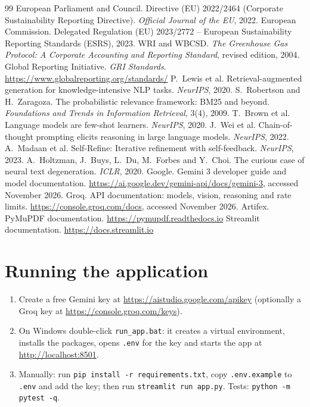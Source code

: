 \documentclass[11pt,a4paper]{article}
\newcommand{\code}[1]{\texttt{\small #1}}
\begin{document}
\begin{thebibliography}{99}\small
{} European Parliament and Council. Directive (EU) 2022/2464 (Corporate Sustainability Reporting Directive). \emph{Official Journal of the EU}, 2022.
 European Commission. Delegated Regulation (EU) 2023/2772 -- European Sustainability Reporting Standards (ESRS), 2023.
 WRI and WBCSD. \emph{The Greenhouse Gas Protocol: A Corporate Accounting and Reporting Standard}, revised edition, 2004.
 Global Reporting Initiative. \emph{GRI Standards}. \url{https://www.globalreporting.org/standards/}
 P.~Lewis et al. Retrieval-augmented generation for knowledge-intensive NLP tasks. \emph{NeurIPS}, 2020.
 S.~Robertson and H.~Zaragoza. The probabilistic relevance framework: BM25 and beyond. \emph{Foundations and Trends in Information Retrieval}, 3(4), 2009.
 T.~Brown et al. Language models are few-shot learners. \emph{NeurIPS}, 2020.
 J.~Wei et al. Chain-of-thought prompting elicits reasoning in large language models. \emph{NeurIPS}, 2022.
 A.~Madaan et al. Self-Refine: Iterative refinement with self-feedback. \emph{NeurIPS}, 2023.
 A.~Holtzman, J.~Buys, L.~Du, M.~Forbes and Y.~Choi. The curious case of neural text degeneration. \emph{ICLR}, 2020.
 Google. Gemini 3 developer guide and model documentation. \url{https://ai.google.dev/gemini-api/docs/gemini-3}, accessed November 2026.
 Groq. API documentation: models, vision, reasoning and rate limits. \url{https://console.groq.com/docs}, accessed November 2026.
 Artifex. PyMuPDF documentation. \url{https://pymupdf.readthedocs.io}
 Streamlit documentation. \url{https://docs.streamlit.io}
\end{thebibliography}

\appendix
\section{Running the application}
\begin{enumerate}
  \item Create a free Gemini key at \url{https://aistudio.google.com/apikey} (optionally a Groq key at
        \url{https://console.groq.com/keys}).
  \item On Windows double-click \code{run\_app.bat}: it creates a virtual environment, installs the packages,
        opens \code{.env} for the key and starts the app at \url{http://localhost:8501}.
  \item Manually: run \code{pip install -r requirements.txt}, copy \code{.env.example} to \code{.env} and add the key; then run
        \code{streamlit run app.py}. Tests: \code{python -m pytest -q}.
\end{enumerate}
\end{document}
